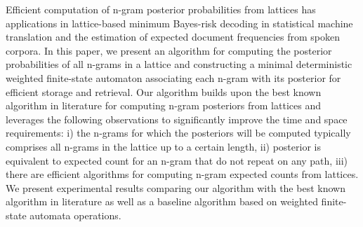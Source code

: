 Efficient computation of n-gram posterior probabilities from lattices has applications in lattice-based minimum Bayes-risk decoding in statistical machine translation and the estimation of expected document frequencies from spoken corpora. In this paper, we present an algorithm for computing the posterior probabilities of all n-grams in a lattice and constructing a minimal deterministic weighted finite-state automaton associating each n-gram with its posterior for efficient storage and retrieval. Our algorithm builds upon the best known algorithm in literature for computing n-gram posteriors from lattices and leverages the following observations to significantly improve the time and space requirements: i) the n-grams for which the posteriors will be computed typically comprises all n-grams in the lattice up to a certain length, ii) posterior is equivalent to expected count for an n-gram that do not repeat on any path, iii) there are efficient algorithms for computing n-gram expected counts from lattices. We present experimental results comparing our algorithm with the best known algorithm in literature as well as a baseline algorithm based on weighted finite-state automata operations.
